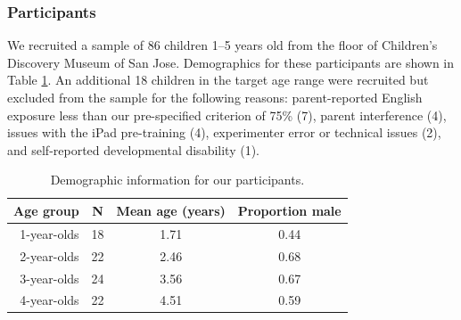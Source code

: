 \documentclass[man,noapacite]{apa2}
\begin{document}
\subsubsection{Participants}                                                                                                                              


We recruited a sample of 86 children 1--5 years old from the floor of Children's Discovery Museum of San Jose. Demographics for these participants are shown in Table \ref{tab:demo}. An additional 18 children in the target age range were recruited but excluded from the sample for the following reasons: parent-reported English exposure less than our pre-specified criterion of 75\% (7), parent interference (4), issues with the iPad pre-training (4), experimenter error or technical issues (2), and self-reported developmental disability (1). 

\begin{table}[t]
\centering
\caption{\label{tab:demo} Demographic information for our participants.}
\begin{tabular}{rccc}
  \hline
Age group & N & Mean age (years) & Proportion male \\ 
  \hline
1-year-olds &  18 & 1.71 & 0.44 \\ 
2-year-olds &  22 & 2.46 & 0.68 \\ 
3-year-olds &  24 & 3.56 & 0.67 \\ 
4-year-olds &  22 & 4.51 & 0.59 \\ 
   \hline
\end{tabular}
\end{table}
\end{document}
